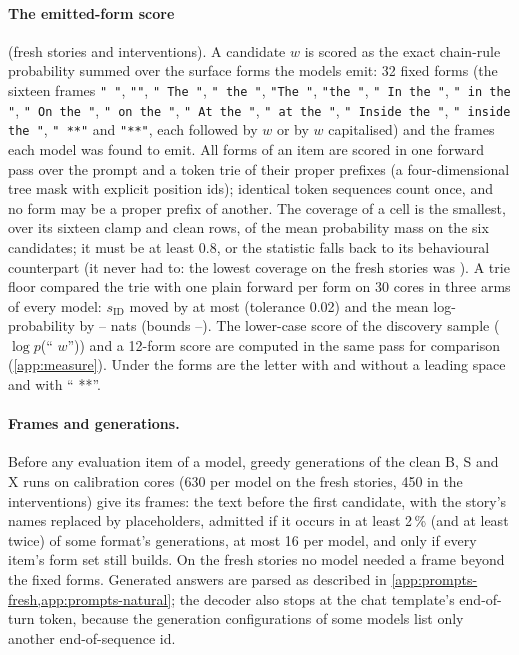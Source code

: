\paragraph{The emitted-form score}\label{app:emitted}(fresh stories and interventions). A candidate $w$ is scored as the exact chain-rule probability summed over the surface forms the models emit: 32 fixed forms (the sixteen frames \texttt{" "}, \texttt{""}, \texttt{" The "}, \texttt{" the "}, \texttt{"The "}, \texttt{"the "}, \texttt{" In the "}, \texttt{" in the "}, \texttt{" On the "}, \texttt{" on the "}, \texttt{" At the "}, \texttt{" at the "}, \texttt{" Inside the "}, \texttt{" inside the "}, \texttt{" **"} and \texttt{"**"}, each followed by $w$ or by $w$ capitalised) and the frames each model was found to emit. All forms of an item are scored in one forward pass over the prompt and a token trie of their proper prefixes (a four-dimensional tree mask with explicit position ids); identical token sequences count once, and no form may be a proper prefix of another. The coverage of a cell is the smallest, over its sixteen clamp and clean rows, of the mean probability mass on the six candidates; it must be at least 0.8, or the statistic falls back to its behavioural counterpart (it never had to: the lowest coverage on the fresh stories was \JbGfourCovMin{}). A trie floor compared the trie with one plain forward per form on 30 cores in three arms of every model: $s_{\mathrm{ID}}$ moved by at most \JbGthreeDsMax{} (tolerance 0.02) and the mean log-probability by \JbGthreeDLMin{}--\JbGthreeDLMax{} nats (bounds \JbGthreeBoundMin{}--\JbGthreeBoundMax{}). The lower-case score of the discovery sample ($\log p$(`` $w$'')) and a 12-form score are computed in the same pass for comparison (\cref{app:measure}). Under \fmtLetter{} the forms are the letter with and without a leading space and with `` **''.

\paragraph{Frames and generations.} Before any evaluation item of a model, greedy generations of the clean B, S and X runs on calibration cores (630 per model on the fresh stories, 450 in the interventions) give its frames: the text before the first candidate, with the story's names replaced by placeholders, admitted if it occurs in at least 2\,\% (and at least twice) of some format's generations, at most 16 per model, and only if every item's form set still builds. On the fresh stories no model needed a frame beyond the fixed forms. Generated answers are parsed as described in \cref{app:prompts-fresh,app:prompts-natural}; the decoder also stops at the chat template's end-of-turn token, because the generation configurations of some models list only another end-of-sequence id. %

